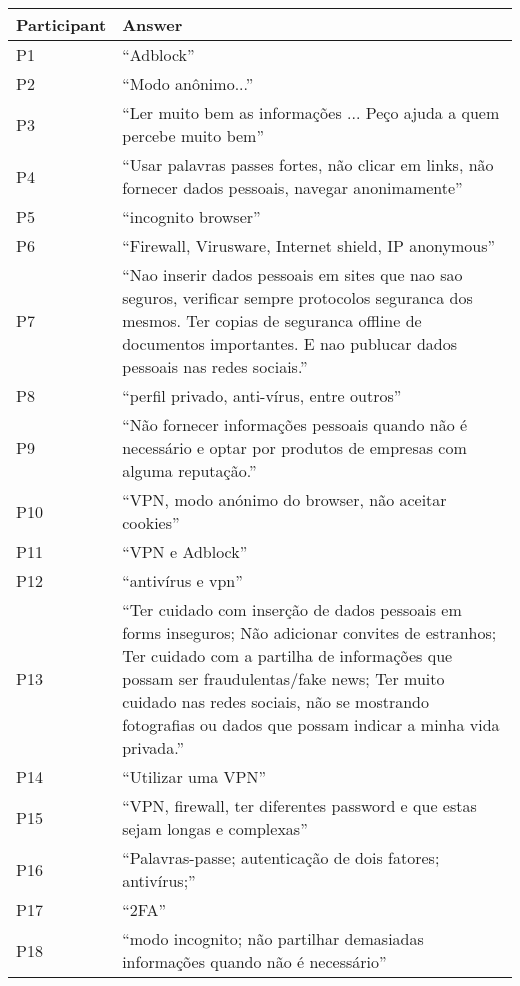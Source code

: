 \begin{longtable}{p{3cm} p{13cm}}
    \hline
    \textbf{Participant} & \textbf{Answer} \\
    \hline
    P1 & ``Adblock'' \\
    \hline
    P2 & ``Modo anônimo...'' \\
    \hline
    P3 & ``Ler muito bem as informações ... Peço ajuda a quem percebe muito bem'' \\
    \hline
    P4 & ``Usar palavras passes fortes, não clicar em links, não fornecer dados pessoais, navegar anonimamente'' \\
    \hline
    P5 & ``incognito browser'' \\
    \hline
    P6 & ``Firewall, Virusware, Internet shield, IP anonymous'' \\
    \hline
    P7 & ``Nao inserir dados pessoais em sites que nao sao seguros, verificar sempre protocolos seguranca dos mesmos. Ter copias de seguranca offline de documentos importantes. E nao publucar dados pessoais nas redes sociais.'' \\
    \hline
    P8 & ``perfil privado, anti-vírus, entre outros'' \\
    \hline
    P9 & ``Não fornecer informações pessoais quando não é necessário e optar por produtos de empresas com alguma reputação.'' \\
    \hline
    P10 & ``VPN, modo anónimo do browser, não aceitar cookies'' \\
    \hline
    P11 & ``VPN e Adblock'' \\
    \hline
    P12 & ``antivírus e vpn'' \\
    \hline
    P13 & ``Ter cuidado com inserção de dados pessoais em forms inseguros; Não adicionar convites de estranhos; Ter cuidado com a partilha de informações que possam ser fraudulentas/fake news; Ter muito cuidado nas redes sociais, não se mostrando fotografias ou dados que possam indicar a minha vida privada.'' \\
    \hline
    P14 & ``Utilizar uma VPN'' \\
    \hline
    P15 & ``VPN, firewall, ter diferentes password e que estas sejam longas e complexas'' \\
    \hline
    P16 & ``Palavras-passe; autenticação de dois fatores; antivírus;'' \\
    \hline
    P17 & ``2FA'' \\
    \hline
    P18 & ``modo incognito; não partilhar demasiadas informações quando não é necessário'' \\

\end{longtable}
